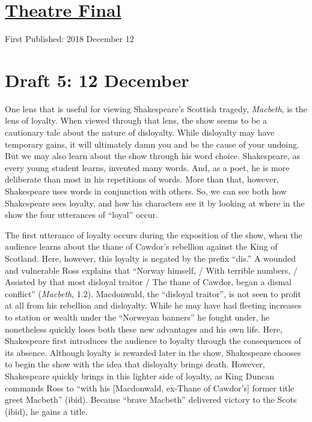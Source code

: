 \documentclass[12pt]{article}[titlepage]
\newcommand{\say}[1]{``#1''}
\newcommand{\1}{\={a}}
\newcommand{\2}{\={e}}
\newcommand{\3}{\={\i}}
\newcommand{\4}{\=o}
\newcommand{\5}{\=u}
\newcommand{\6}{\={A}}
\renewcommand{\,}{\textsuperscript{,}}
\begin{document}
\doublespacing
\section{\href{theatre-final.html}{Theatre Final}}
First Published: 2018 December 12
\section{Draft 5: 12 December}
One lens that is useful for viewing Shakespeare's Scottish tragedy, \textit{Macbeth}, is the lens of loyalty.
When viewed through that lens, the show seems to be a cautionary tale about the nature of disloyalty.
While disloyalty may have temporary gains, it will ultimately damn you and be the cause of your undoing.
But we may also learn about the show through his word choice.
Shakespeare, as every young student learns, invented many words.
And, as a poet, he is more deliberate than most in his repetitions of words.
More than that, however, Shakespeare uses words in conjunction with others.
So, we can see both how Shakespeare sees loyalty, and how his characters see it by looking at where in the show the four utterances of \say{loyal} occur.

The first utterance of loyalty occurs during the exposition of the show, when the audience learns about the thane of Cawdor's rebellion against the King of Scotland.
Here, however, this loyalty is negated by the prefix \say{dis.}
A wounded and vulnerable Ross explains that \say{Norway himself, / With terrible numbers, / Assisted by that most disloyal traitor / The thane of Cawdor, began a dismal conflict} (\textit{Macbeth}, 1.2).
Macdonwald, the \say{disloyal traitor}, is not seen to profit at all from his rebellion and disloyalty.
While he may have had fleeting increases to station or wealth under the \say{Norweyan banners} he fought under, he nonetheless quickly loses both these new advantages and his own life.
Here, Shakespeare first introduces the audience to loyalty through the consequences of its absence.
Although loyalty is rewarded later in the show, Shakespeare chooses to begin the show with the idea that disloyalty brings death.
However, Shakespeare quickly brings in this lighter side of loyalty, as King Duncan commands Ross to \say{with his [Macdonwald, ex-Thane of Cawdor's] former title greet Macbeth} (ibid).
Because \say{brave Macbeth} delivered victory to the Scots (ibid), he gains a title.
\end{document}
